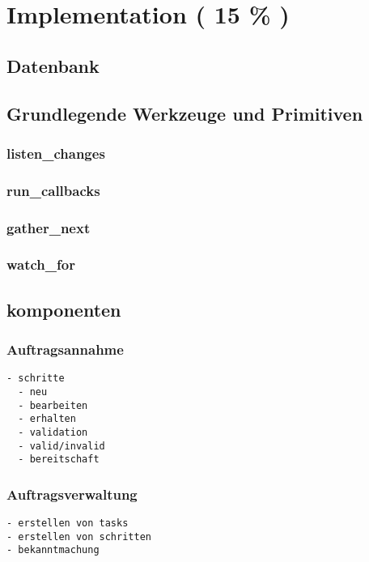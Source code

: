 \chapter{Implementation ( 15 \% ) }



\section{Datenbank}
\section{Grundlegende Werkzeuge und Primitiven}

\subsection{listen\_changes}

\subsection{run\_callbacks}
\subsection{gather\_next}
\subsection{watch\_for}

\section{komponenten}

\subsection{Auftragsannahme}

\begin{verbatim}
- schritte
  - neu
  - bearbeiten
  - erhalten
  - validation
  - valid/invalid
  - bereitschaft
\end{verbatim}

\subsection{Auftragsverwaltung}

\begin{verbatim}
- erstellen von tasks
- erstellen von schritten
- bekanntmachung
\end{verbatim}

